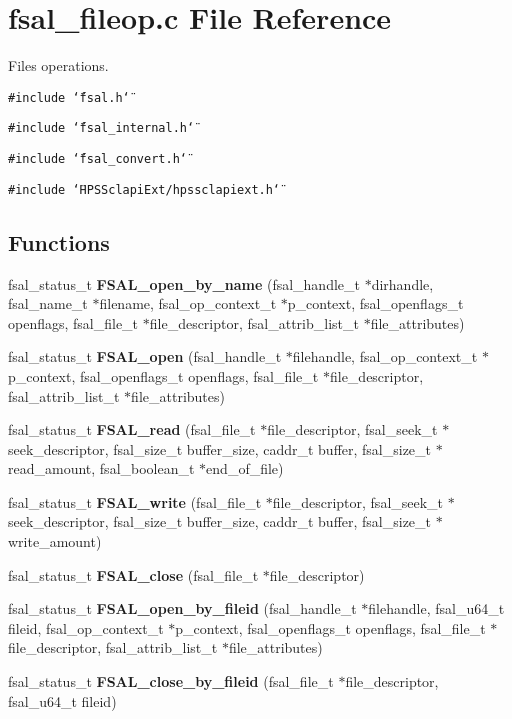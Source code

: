 \section{fsal\_\-fileop.c File Reference}
\label{fsal__fileop_8c}
Files operations.  


{\tt \#include \char`\"{}fsal.h\char`\"{}}\par
{\tt \#include \char`\"{}fsal\_\-internal.h\char`\"{}}\par
{\tt \#include \char`\"{}fsal\_\-convert.h\char`\"{}}\par
{\tt \#include \char`\"{}HPSSclapiExt/hpssclapiext.h\char`\"{}}\par
\subsection*{Functions}
\begin{CompactItemize}
\item 
fsal\_\-status\_\-t {\bf FSAL\_\-open\_\-by\_\-name} (fsal\_\-handle\_\-t $\ast$dirhandle, fsal\_\-name\_\-t $\ast$filename, fsal\_\-op\_\-context\_\-t $\ast$p\_\-context, fsal\_\-openflags\_\-t openflags, fsal\_\-file\_\-t $\ast$file\_\-descriptor, fsal\_\-attrib\_\-list\_\-t $\ast$file\_\-attributes)
\item 
fsal\_\-status\_\-t {\bf FSAL\_\-open} (fsal\_\-handle\_\-t $\ast$filehandle, fsal\_\-op\_\-context\_\-t $\ast$p\_\-context, fsal\_\-openflags\_\-t openflags, fsal\_\-file\_\-t $\ast$file\_\-descriptor, fsal\_\-attrib\_\-list\_\-t $\ast$file\_\-attributes)
\item 
fsal\_\-status\_\-t {\bf FSAL\_\-read} (fsal\_\-file\_\-t $\ast$file\_\-descriptor, fsal\_\-seek\_\-t $\ast$seek\_\-descriptor, fsal\_\-size\_\-t buffer\_\-size, caddr\_\-t buffer, fsal\_\-size\_\-t $\ast$read\_\-amount, fsal\_\-boolean\_\-t $\ast$end\_\-of\_\-file)
\item 
fsal\_\-status\_\-t {\bf FSAL\_\-write} (fsal\_\-file\_\-t $\ast$file\_\-descriptor, fsal\_\-seek\_\-t $\ast$seek\_\-descriptor, fsal\_\-size\_\-t buffer\_\-size, caddr\_\-t buffer, fsal\_\-size\_\-t $\ast$write\_\-amount)
\item 
fsal\_\-status\_\-t {\bf FSAL\_\-close} (fsal\_\-file\_\-t $\ast$file\_\-descriptor)
\item 
fsal\_\-status\_\-t \textbf{FSAL\_\-open\_\-by\_\-fileid} (fsal\_\-handle\_\-t $\ast$filehandle, fsal\_\-u64\_\-t fileid, fsal\_\-op\_\-context\_\-t $\ast$p\_\-context, fsal\_\-openflags\_\-t openflags, fsal\_\-file\_\-t $\ast$file\_\-descriptor, fsal\_\-attrib\_\-list\_\-t $\ast$file\_\-attributes)\label{fsal__fileop_8c_5afa8e38170a21da36015a18d0d905a4}

\item 
fsal\_\-status\_\-t \textbf{FSAL\_\-close\_\-by\_\-fileid} (fsal\_\-file\_\-t $\ast$file\_\-descriptor, fsal\_\-u64\_\-t fileid)\label{fsal__fileop_8c_4e3271d5450b56071010e1ef556a3d80}

\end{CompactItemize}


